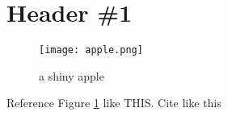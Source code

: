 


\section{Header \#1}
\lipsum

\begin{figure}[H]
    \centering
    \texttt{[image: apple.png]}
    \caption{a shiny apple}
    \label{fig:apple1}
\end{figure}

Reference Figure \ref{fig:apple1} like THIS. Cite like this \cite{atlassian-git}

\newpage

